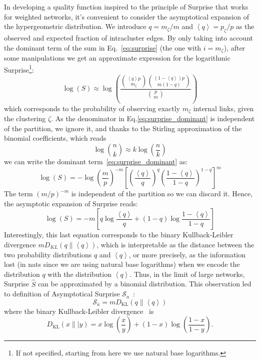 In developing a quality function inspired to the principle of Surprise that works for weighted networks, it's convenient to consider the asymptotical expansion of the hypergeometric distribution. We introduce  $q=m_\zeta/m$ and $\left<q \right>=p_\zeta/p$ as the observed and expected fraction of intracluster edges. By only taking into account the dominant term of the sum in Eq.~\ref{eq:surprise} (the one with $i=m_\zeta$), after some manipulations we get an approximate expression for the logarithmic Surprise\footnote{If not specified, starting from here we use natural base logarithms.}:
\begin{equation}\label{eq:surprise_dominant}
\log(S) \approx \log \left( \frac{\binom{\left<q\right> p}{m_\zeta} \binom{(1-\left<q\right>)p}{m(1-q)}}{\binom{p}{m}} \right)
\end{equation}
which corresponds to the probability of observing exactly $m_\zeta$ internal links, given the clustering $\zeta$. As the denominator in Eq.\ref{eq:surprise_dominant} is independent of the partition, we ignore it, and thanks to the Stirling approximation of the binomial coefficients, which reads 
\begin{equation}
\log \binom{n}{k} \approx k \log \left( \frac{n}{k} \right)
\end{equation}
we can write the dominant term~\ref{eq:surprise_dominant} as:
\begin{equation}
\log(S) = - \log \left(\frac{m}{p}\right)^{-m} \left[ \left(\frac{\left< q\right>}{q}\right)^q \left(\frac{1-\left< q\right>}{1-q}\right)^{1-q} \right]^{m}
\end{equation}
The term $(m/p)^{-m}$ is independent of the partition so we can discard it. Hence, the asymptotic expansion of Surprise reads:
\begin{equation}
\log(S) = -m \left[ q \log \frac{\left<q\right>}{q} + (1-q)\log \frac{1-\left<q\right>}{1-q} \right]
\end{equation}
Interestingly, this last equation corresponds to the binary Kullback-Leibler divergence $m D_{KL}(q \| \left< q \right>)$, which is interpretable as the distance between the two probability distributions $q$ and $\left<q\right>$, or more precisely, as the information lost (in nats since we are using natural base logarithms) when we encode the distribution $q$ with the distribution $\left< q\right>$. 
Thus, in the limit of large networks, Surprise $\hat{S}$ can be approximated by a binomial distribution. This observation led to definition of Asymptotical Surprise $\mathcal{S}_a$~\cite{traag2015}:
\begin{equation}\label{eq:asymptoticalsurprise}
\mathcal{S}_a = m D_{\textrm{KL}}\left( q \| \left< q \right> \right)
\end{equation}
where the binary Kullback-Leibler divergence~\cite{kullback1951} is $$D_{\textrm{KL}}(x\|| y) = x \log \left(\frac{x}{y} \right) + (1-x)\log \left (\frac{1-x}{1-y} \right).$$

